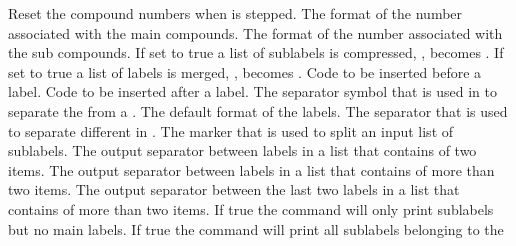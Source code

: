 \documentclass[load-preamble+,babel-options={ngerman,british,american}]{cnltx-doc}
\begin{document}
\begin{options}
    Reset the compound numbers when  is stepped.
    The format of the number associated with the main compounds.
    The format of the number associated with the sub compounds.
    If set to true a list of sublabels is compressed, \ie,
     becomes
    .
    If set to true a list of labels is merged, \ie,
     becomes .
  \Default
    Code to be inserted before a label.
  \Default
    Code to be inserted after a label.
    The separator symbol that is used in  to separate the  from a .
    The default format of the labels.
  \Default{,}
    The separator that is used to separate different  in
    .
  \Default{,}
    The marker that is used to split an input list of sublabels.
    The output separator between labels in a list that contains of two items.
  \Default{\visualizespaces{, }}
    The output separator between labels in a list that contains of more than
    two items.
    The output separator between the last two labels in a list that contains
    of more than two items.
    If true the command  will only print sublabels but no main
    labels.
    If true the command  will print all sublabels belonging to the

\end{options}
\end{document}
